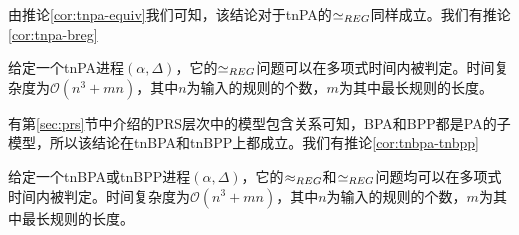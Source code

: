 由推论\ref{cor:tnpa-equiv}我们可知，该结论对于tnPA的$\simeq_{REG}$同样成立。我们有推论\ref{cor:tnpa-breg}

\begin{cor}\label{cor:tnpa-breg}
给定一个tnPA进程$(\alpha,\Delta)$，它的$\simeq_{REG}$问题可以在多项式时间内被判定。时间复杂度为$\mathcal{O}(n^3+mn)$，其中$n$为输入的规则的个数，$m$为其中最长规则的长度。
\end{cor}

有第\ref{sec:prs}节中介绍的PRS层次中的模型包含关系可知，BPA和BPP都是PA的子模型，所以该结论在tnBPA和tnBPP上都成立。我们有推论\ref{cor:tnbpa-tnbpp}

\begin{cor}\label{cor:tnbpa-tnbpp}
给定一个tnBPA或tnBPP进程$(\alpha,\Delta)$，它的$\approx_{REG}$和$\simeq_{REG}$问题均可以在多项式时间内被判定。时间复杂度为$\mathcal{O}(n^3+mn)$，其中$n$为输入的规则的个数，$m$为其中最长规则的长度。
\end{cor}


